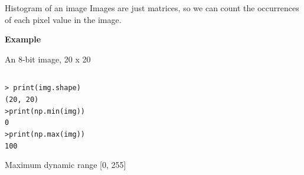 \documentclass[9pt, aspectratio=169]{beamer}
\begin{document}
\begin{frame}
    {Histogram of an image}
    Images are just matrices, so we can count the occurrences of each pixel value in the image.

    \textbf{Example}

    An 8-bit image, 20 x 20

    \begin{columns}
        \begin{column}{0.5\textwidth}
            \begin{codebox}
                \texttt{> print(img.shape)\\
                    (20, 20)\\
                    >print(np.min(img))\\
                    0\\
                    >print(np.max(img))\\
                    100
                }
            \end{codebox}
            {
                Maximum dynamic range [0, 255]

}
\end{column}
\end{columns}
\end{frame}
\end{document}
